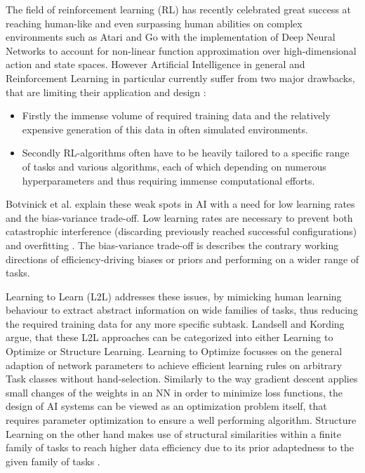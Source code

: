 \documentclass[letterpaper, 10 pt, conference]{ieeeconf}  %
\begin{document}
The field of reinforcement learning (RL) has recently celebrated great success at reaching human-like and even surpassing human abilities on
complex environments such as Atari \cite{mnihAsynchronousMethodsDeep2016} and Go \cite{silverMasteringGameGo2016} with the implementation 
of Deep Neural Networks to 
account for non-linear function approximation over high-dimensional action and state spaces. However Artificial Intelligence in general 
\cite{lansdellLearningtolearn2018} and Reinforcement Learning in particular \cite{duanRLFastReinforcement2016} currently
suffer from two major drawbacks, 
that are limiting their application and design \cite{wangLearningReinforcementLearn2016}:
\begin{itemize}
        \item Firstly the immense volume of required training data and the relatively expensive generation of this data in often simulated
        environments.
        \item Secondly RL-algorithms often have to be heavily tailored to a specific range of tasks and various algorithms, each of which
        depending on numerous hyperparameters and thus requiring immense computational efforts.
\end{itemize}        

Botvinick et al. \cite{botvinickReinforcementLearningFast2019} explain these weak spots in AI with a need for low 
learning rates and the bias-variance trade-off.
Low learning rates are necessary to prevent both catastrophic interference (discarding previously reached successful
configurations) and overfitting \cite{hardtTrainFasterGeneralize2015}. The bias-variance trade-off is describes the contrary 
working directions of efficiency-driving biases or priors and performing on a wider range of tasks. \newline

Learning to Learn (L2L) addresses these issues, by mimicking human learning behaviour to extract abstract information on wide
families of tasks, thus reducing the required training data for any more specific subtask. Landsell and
Kording\cite{lansdellLearningtolearn2018} argue, 
that these L2L approaches can be categorized into 
either Learning to Optimize or Structure Learning. Learning to Optimize focusses on the general 
adaption of network parameters to achieve efficient learning rules on arbitrary Task classes without hand-selection. Similarly to the way
gradient descent applies small changes of the weights in an NN in order to minimize loss functions, the design of AI systems can be viewed as
an optimization problem itself, that requires parameter optimization to ensure a well performing algorithm. Structure Learning 
on the other hand makes use of structural similarities within a finite family of tasks to reach higher data
efficiency due to its prior adaptedness to the given family of tasks \cite{lansdellLearningtolearn2018}. \newline
\end{document}
